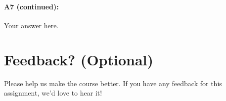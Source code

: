 \pagebreak
\paragraph{A7 (continued):} Your answer here.







\pagebreak
\section*{Feedback? (Optional)}
Please help us make the course better. If you have any feedback for this assignment, we'd love to hear it!




